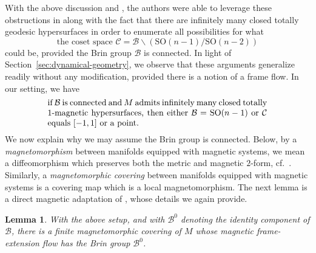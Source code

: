 \documentclass[pdftex]{sigma}
\newcommand{\SO}{\text{SO}}
\numberwithin{equation}{section}
\newtheorem{Lemma}[Theorem]{Lemma}
\theoremstyle{definition}
\begin{document}
 With the above discussion and \cite[Step 1 of proof of Theorem 3.1]{cekic2024ergodicity}, the authors were able to leverage these obstructions in \cite[Proposition 3.3.5]{filip2024finiteness} along with the fact that there are infinitely many closed totally geodesic hypersurfaces in order to enumerate all possibilities for what \begin{equation}\label{coset-space}\mbox{the coset space }\mathcal{C}= \mathcal{B} \backslash (\SO(n-1)/\SO(n-2))\end{equation} could be, provided the Brin group $\mathcal{B}$ is connected. In light of Section~\ref{sec:dynamical-geometry}, we observe that these arguments generalize readily without any modification, provided there is a notion of a frame flow. In our setting, we have \begin{equation}\label{Brin-dichotomy}
\parbox{.75\textwidth}{if $\mathcal{B}$ is connected and $M$ admits infinitely many closed totally $1$-magnetic hypersurfaces, then either $\mathcal{B} = \SO(n-1)$ or $\mathcal{C}$ equals $[-1,1]$ or a point.}
 \end{equation}
We now explain why we may assume the Brin group is connected. Below, by a \emph{magnetomorphism} between manifolds equipped with magnetic systems, we mean a diffeomorphism which preserves both the metric and magnetic $2$-form, cf.\ \cite[Section 1.1]{ABM_2025}. Similarly, a \emph{magnetomorphic covering} between manifolds equipped with magnetic systems is a covering map which is a local magnetomorphism. The next lemma is a direct magnetic adaptation of \cite[Lemma 3.3]{cekic2024ergodicity}, whose details
we again provide.

\begin{Lemma}\label{Brin-connected}
 With the above setup, and with $\mathcal{B}^0$ denoting the identity component of $\mathcal{B}$, there is a finite magnetomorphic covering of $M$ whose magnetic frame-extension flow has the Brin group $\mathcal{B}^0$.
\end{Lemma}
\end{document}

